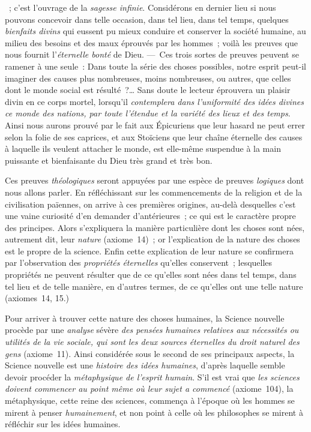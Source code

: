 \documentclass[french,twoside]{book} %
\newcommand{\bibl}[1]{{\RaggedLeft{#1}\par\bigskip}}
\begin{document}
{\bibl{{\itshape Art poétique}. ({\itshape Vico.})}
} ; c’est l’ouvrage de la {\itshape sagesse infinie}. Considérons en dernier lieu si nous pouvons concevoir dans telle occasion, dans tel lieu, dans tel temps, quelques {\itshape bienfaits divins} qui eussent pu mieux conduire et conserver la société humaine, au milieu des besoins et des maux éprouvés par les hommes ; voilà les preuves que nous fournit l’{\itshape éternelle bonté} de Dieu. — Ces trois sortes de preuves peuvent se ramener à une seule : Dans toute la série des choses possibles, notre esprit peut-il imaginer des causes plus nombreuses, moins nombreuses, ou autres, que celles dont le monde social est résulté ?… Sans doute le lecteur éprouvera un plaisir divin en ce corps mortel, lorsqu’il {\itshape contemplera dans l’uniformité des idées divines ce monde des nations, par toute l’étendue et la variété des lieux et des temps}. Ainsi nous aurons prouvé par le fait aux Épicuriens que leur hasard ne peut errer selon la folie de ses caprices,  et aux Stoïciens que leur chaîne éternelle des causes à laquelle ils veulent attacher le monde, est elle-même suspendue à la main puissante et bienfaisante du Dieu très grand et très bon.\par
Ces preuves {\itshape théologiques} seront appuyées par une espèce de preuves {\itshape logiques} dont nous allons parler. En réfléchissant sur les commencements de la religion et de la civilisation païennes, on arrive à ces premières origines, au-delà desquelles c’est une vaine curiosité d’en demander d’antérieures ; ce qui est le caractère propre des principes. Alors s’expliquera la manière particulière dont les choses sont nées, autrement dit, leur {\itshape nature} (axiome 14) ; or l’explication de la nature des choses est le propre de la science. Enfin cette explication de leur nature se confirmera par l’observation des {\itshape propriétés éternelles} qu’elles conservent ; lesquelles propriétés ne peuvent résulter que de ce qu’elles sont nées dans tel temps, dans tel lieu et de telle manière, en d’autres termes, de ce qu’elles ont une telle nature (axiomes 14, 15.)\par
Pour arriver à trouver cette nature des choses humaines, la Science nouvelle procède par une {\itshape analyse} sévère {\itshape des pensées humaines relatives aux nécessités ou utilités de la vie sociale, qui sont les deux sources éternelles du droit naturel des gens} (axiome 11). Ainsi considérée sous le second de ses principaux aspects, la Science nouvelle est une {\itshape histoire des idées humaines}, d’après laquelle semble devoir procéder la {\itshape métaphysique de l’esprit humain}. S’il est vrai  que {\itshape les sciences doivent commencer au point même où leur sujet a commencé} (axiome 104), la métaphysique, cette reine des sciences, commença à l’époque où les hommes se mirent à penser {\itshape humainement}, et non point à celle où les philosophes se mirent à réfléchir sur les idées humaines.\par
\end{document}
